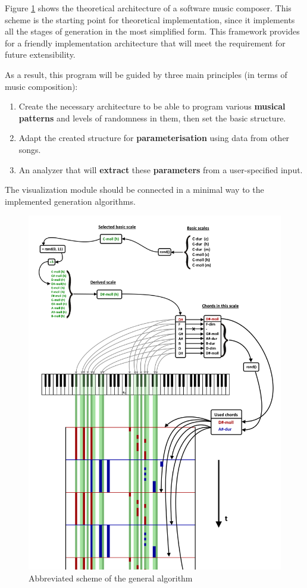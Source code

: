 \documentclass[thesis=B,english]{FITthesis}[2019/12/23]
\begin{document}
Figure \ref{fig:TheoryDesign1} shows the theoretical architecture of a software music composer. This scheme is the starting point for theoretical implementation, since it implements all the stages of generation in the most simplified form. This framework provides for a friendly implementation architecture that will meet the requirement for future extensibility.

As a result, this program will be guided by three main principles (in terms of music composition):
\begin{enumerate}
    \item Create the necessary architecture to be able to program various \textbf{musical patterns} and levels of randomness in them, then set the basic structure.
    \item Adapt the created structure for \textbf{parameterisation} using data from other songs.
    \item An analyzer that will \textbf{extract} these \textbf{parameters} from a user-specified input.
\end{enumerate}

The visualization module should be connected in a minimal way to the implemented generation algorithms.

\clearpage

\begin{figure}[!ht]
            \includegraphics[width=\textwidth]{TheoryDesign1.png}
            \caption{Abbreviated scheme of the general algorithm}
            \label{fig:TheoryDesign1}
\end{figure}
\end{document}
